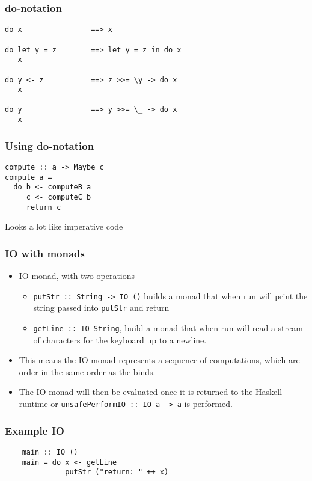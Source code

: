 \documentclass{beamer} %
\begin{document}
\begin{frame}[fragile]\frametitle{do-notation}
\begin{verbatim}
do x                ==> x

do let y = z        ==> let y = z in do x
   x

do y <- z           ==> z >>= \y -> do x
   x

do y                ==> y >>= \_ -> do x
   x

\end{verbatim}
\end{frame}

\begin{frame}[fragile]\frametitle{Using do-notation}
\begin{verbatim}
compute :: a -> Maybe c
compute a =
  do b <- computeB a
     c <- computeC b
     return c
\end{verbatim}

Looks a lot like imperative code
\end{frame}




\begin{frame}[fragile]\frametitle{IO with monads}
  \begin{itemize}

    \item IO monad, with two operations
      \begin{itemize}
        \item \texttt{putStr :: String -> IO ()} builds a monad that when run will
          print the string passed into \texttt{putStr} and return
        \item \texttt{getLine :: IO String}, build a monad that when run
          will read a stream of characters for the keyboard up to a newline.
      \end{itemize}
    \item This means the IO monad represents a sequence of computations, which are order in the same order
      as the binds.

    \item The IO monad will then be evaluated once it is returned to the Haskell runtime or \texttt{unsafePerformIO :: IO a -> a} is performed.

  \end{itemize}
\end{frame}


\begin{frame}[fragile]\frametitle{Example IO}
  \begin{verbatim}
    main :: IO ()
    main = do x <- getLine
              putStr ("return: " ++ x)
  \end{verbatim}
\end{frame}
\end{document}

